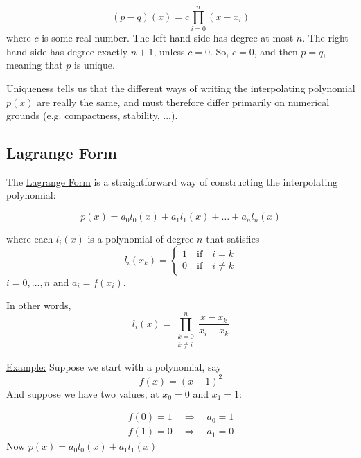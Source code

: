 \begin{equation*}
    (p-q)(x) = c \prod_{i=0}^n (x-x_i)
\end{equation*}
where $c$ is some real number. The left hand side has degree at most $n$. The right hand side has degree exactly $n+1$, unless $c=0$. So, $c=0$, and then $p=q$, meaning that $p$ is unique. 

Uniqueness tells us that the different ways of writing the interpolating polynomial $p(x)$ are really the same, and must therefore differ primarily on numerical grounds (e.g. compactness, stability, ...).

\subsection{Lagrange Form}

The \underline{Lagrange Form} is a straightforward way of constructing the interpolating polynomial:

\begin{equation*}
    p(x) = a_0 l_0 (x) + a_1 l_1 (x) + \dots + a_n l_n (x)
\end{equation*}

where each $l_i(x)$ is a polynomial of degree $n$ that satisfies
\begin{equation*}
    l_i(x_k) = \begin{cases}
      1 \quad \mathrm{if} \quad i=k\\
      0 \quad \mathrm{if} \quad i \neq k
    \end{cases}  
\end{equation*}
$i=0,\dots,n$ and $a_i=f(x_i)$. 

In other words,
\begin{equation*}
    l_i(x) = \prod_{\substack{k=0 \\ k\neq i}}^n \frac{x-x_k}{x_i-x_k}
\end{equation*} 

\underline{Example:} Suppose we start with a polynomial, say 
\begin{equation*}
    f(x) = (x-1)^2
\end{equation*}
And suppose we have two values, at $x_0=0$ and $x_1 = 1$:

\begin{equation*}
    \begin{split}
        f(0)=1 \quad \Rightarrow \quad a_0 = 1 \\
        f(1)=0 \quad \Rightarrow \quad a_1 = 0
    \end{split}
\end{equation*}
Now $p(x) = a_0 l_0 (x) + a_1 l_1 (x)$ 

